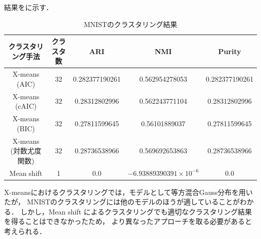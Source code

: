 結果をに示す．

\begin{table}[htb]
  \centering
  \caption{MNISTのクラスタリング結果}
  \label{table:mnist}
  \begin{tabular}{|c|c|c|c|c|} \hline
    クラスタリング手法 & クラスタ数 & ARI & NMI & Purity \\\hline
    X-means (AIC) & 32 & 0.282377190261 & 0.562954278053 & 0.282377190261\\
    X-means (cAIC) & 32 & 0.28312802996 & 0.562243771104 & 0.28312802996\\
    X-means (BIC) & 32 & 0.27811599645 & 0.56101889037 & 0.27811599645\\
    X-means (対数尤度関数)& 32 & 0.28736538966 & 0.569692653863 & 0.28736538966\\
    Mean shift & 1 & 0.0 & $-6.93889390391 \times 10^{-6}$ & 0.0\\\hline
  \end{tabular}
\end{table}

X-meansにおけるクラスタリングでは，モデルとして等方混合Gauss分布を用いたが，
MNISTのクラスタリングには他のモデルのほうが適していることがわかる．
しかし，Mean shift によるクラスタリングでも適切なクラスタリング結果を得ることはできなかったため，
より異なったアプローチを取る必要があると考えられる．

